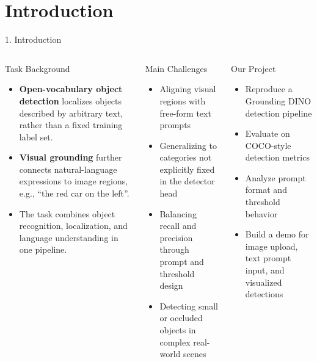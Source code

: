 \documentclass[aspectratio=169,10pt]{beamer}
\begin{document}
\section{Introduction}
\begin{frame}{1. Introduction}
  \begin{columns}[T]
    \begin{block}{Task Background}
      \footnotesize
      \begin{itemize}\setlength{\itemsep}{4pt}
        \item \textbf{Open-vocabulary object detection} localizes objects described by arbitrary text, rather than a fixed training label set.
        \item \textbf{Visual grounding} further connects natural-language expressions to image regions, e.g., ``the red car on the left''.
        \item The task combines object recognition, localization, and language understanding in one pipeline.
      \end{itemize}
    \end{block}

    \vspace{0.1cm}
    \begin{block}{Main Challenges}
      \footnotesize
      \begin{itemize}\setlength{\itemsep}{3pt}
        \item Aligning visual regions with free-form text prompts
        \item Generalizing to categories not explicitly fixed in the detector head
        \item Balancing recall and precision through prompt and threshold design
        \item Detecting small or occluded objects in complex real-world scenes
      \end{itemize}
    \end{block}

    \begin{block}{Our Project}
      \footnotesize
      \begin{itemize}\setlength{\itemsep}{4pt}
        \item Reproduce a Grounding DINO detection pipeline
        \item Evaluate on COCO-style detection metrics
        \item Analyze prompt format and threshold behavior
        \item Build a demo for image upload, text prompt input, and visualized detections
      \end{itemize}
    \end{block}


\end{columns}
\end{frame}
\end{document}
